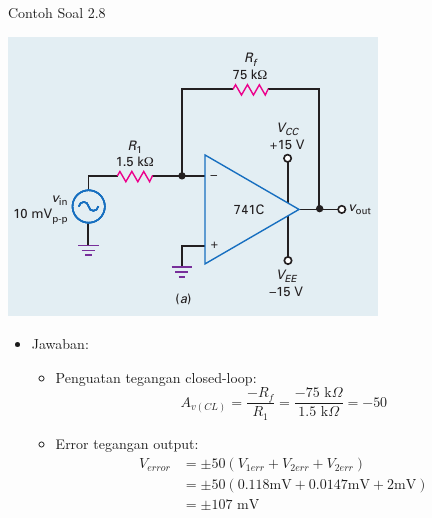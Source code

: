 \begin{frame}{Contoh Soal 2.8}
	\begin{multicols}{2}
		\begin{center}
			\includegraphics[width=\linewidth]{gambar/fig-16.17a}
		\end{center}
		\columnbreak
		\begin{itemize}
			\item Jawaban:
			\begin{itemize}
				\item Penguatan tegangan closed-loop:
				\[ A_{v(CL)} = \frac{-R_f}{R_1} = \frac{-75 \text{ k}\Omega}{1.5 \text{ k}\Omega} = -50\]
				\item Error tegangan output:
				\begin{align*}
					V_{error} &= \pm 50 (V_{1err} + V_{2err} + V_{2err}) \\
					&= \pm 50 (0.118 \text{mV} + 0.0147 \text{mV} + 2 \text{mV}) \\
					&= \pm 107 \text{ mV}
				\end{align*}
			\end{itemize}
		\end{itemize}
	\end{multicols}
\end{frame}

